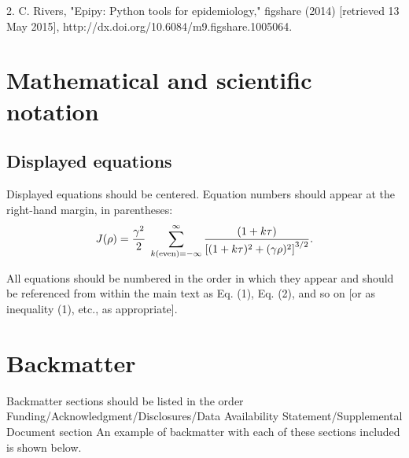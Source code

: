 \documentclass{osa-article}
\begin{document}
2. C. Rivers, "Epipy: Python tools for epidemiology," figshare (2014) [retrieved 13 May 2015], http://dx.doi.org/10.6084/m9.figshare.1005064.


\section{Mathematical and scientific notation}

\subsection{Displayed equations} Displayed equations should be centered.
Equation numbers should appear at the right-hand margin, in
parentheses:
\begin{equation}
J(\rho) =
 \frac{\gamma^2}{2} \; \sum_{k({\rm even}) = -\infty}^{\infty}
	\frac{(1 + k \tau)}{ \left[ (1 + k \tau)^2 + (\gamma  \rho)^2  \right]^{3/2} }.
\end{equation}

All equations should be numbered in the order in which they appear
and should be referenced  from within the main text as Eq. (1),
Eq. (2), and so on [or as inequality (1), etc., as appropriate].

\section{Backmatter}

Backmatter sections should be listed in the order Funding/Acknowledgment/Disclosures/Data Availability Statement/Supplemental Document section
An example of backmatter with each of these sections included is shown below.
\end{document}
